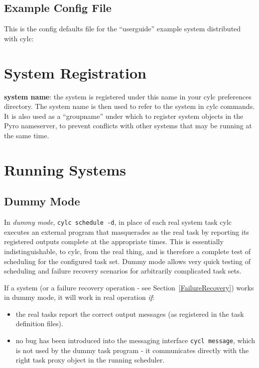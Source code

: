 \documentclass[11pt,a4paper]{article}
\begin{document}
\pagebreak

\subsection{Example Config File}
\label{ExampleConfigFile}

This is the config defaults file for the ``userguide'' example system
distributed with cylc: 

\lstset{ language=Python }
{

}



\lstset{language=}

\pagebreak
\section{System Registration}
\label{SystemRegistration}

{\bf system name}: the system is registered under
        this name in your cylc preferences directory. The system name is
        then used to refer to the system in cylc commands. It is also
        used as a ``groupname'' under which to register system objects 
        in the Pyro nameserver, to prevent conflicts with other systems
        that may be running at the same time.


\section{Running Systems}
\label{RunningdSystems}

\subsection{Dummy Mode} 
\label{DummyMode}

In {\em dummy mode}, \lstinline=cylc schedule -d=, in place of each real
system task cylc executes an external program that masquerades as the
real task by reporting its registered outputs complete at the appropriate
times. This is essentially indistinguishable, to cylc, from the real
thing, and is therefore a complete test of scheduling for the configured
task set. Dummy mode allows very quick testing of scheduling and failure
recovery scenarios for arbitrarily complicated task sets.

If a system (or a failure recovery operation - see
Section~\ref{FailureRecovery}) works in dummy mode, it will work in real
operation {\em if}:
\begin{itemize}
    \item the real tasks report the correct output messages (as
        registered in the task definition files).
    \item no bug has been introduced into the messaging interface
        \lstinline=cycl message=, which is not used by the dummy 
        task program - it communicates directly with the right task
        proxy object in the running scheduler.
\end{itemize}
\end{document}
